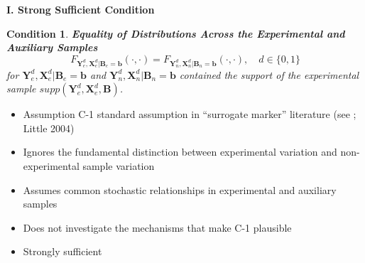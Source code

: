 \documentclass[static]{JJH-Beamer}
\newtheorem{condition}{Condition}
\begin{document}
\begin{frame}

\begin{center}
\textbf{I. Strong Sufficient Condition}
\end{center}

\begin{condition} \textbf{Equality of Distributions Across the Experimental and Auxiliary Samples \label{cond:cond1}}
\begin{equation}
F_{\bm{Y}_e^d, \bm{X}_e^d | \bm{B}_e = \bm{b}} \left( \cdot, \cdot \right) = F_{\bm{Y}_n^d, \bm{X}_n^d | \bm{B}_n = \bm{b}} \left( \cdot, \cdot \right), \quad d \in \{0,1\}
\end{equation}
\noindent for $\bm{Y}_e^d, \bm{X}^d_e | \bm{B}_e = \bm{b}$ and $\bm{Y}_n^d, \bm{X}^d_n | \bm{B}_n = \bm{b}$ contained the support of the experimental sample $supp\left(\bm{Y}^d_{e}, \bm{X}^d_{e}, \bm{B}\right)$.
\end{condition}

\end{frame}

\begin{frame}

\begin{itemize}
\item Assumption C-1 standard assumption in ``surrogate marker'' literature (see \citealp{Prentice_1989_Surrogate_SiM}; Little 2004)
\item Ignores the fundamental distinction between experimental variation and non-experimental sample variation
\item Assumes common stochastic relationships in experimental and auxiliary samples
\item Does not investigate the mechanisms that make C-1 plausible
\end{itemize}

\end{frame}



\begin{itemize}
\item Strongly sufficient
\end{itemize}
\end{document}
